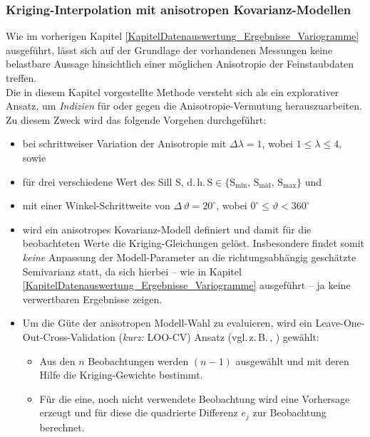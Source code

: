 \subsubsection{Kriging-Interpolation mit anisotropen Kovarianz-Modellen}
\label{KapitelDatenauswertung_Ergebnisse_Kriging}
Wie im vorherigen Kapitel \ref{KapitelDatenauswertung_Ergebnisse_Variogramme} 
ausgeführt, lässt sich auf der Grundlage der vorhandenen Messungen
keine belastbare Aussage hinsichtlich einer möglichen Anisotropie der 
Feinstaubdaten treffen. \\
Die in diesem Kapitel vorgestellte Methode versteht sich als ein explorativer
Ansatz, um \textit{Indizien} für oder gegen die Anisotropie-Vermutung herauszuarbeiten.
Zu diesem Zweck wird das folgende Vorgehen durchgeführt: 
\begin{itemize}[topsep=2pt,parsep=1pt,itemsep=0.5pt]
\item[1) ] bei schrittweiser Variation der Anisotropie mit $\Delta \lambda = 1$, wobei $1 \leq \lambda \leq 4$, sowie
\item[2) ] für drei verschiedene Wert des Sill $\mathrm{S}$, 
d.\,h.\,$\mathrm{S} \in \lbrace \mathrm{S}_{\mathrm{min}},\,\mathrm{S}_{\mathrm{mid}},\,\mathrm{S}_{\mathrm{max}}\rbrace$ und
\item[3) ] mit einer Winkel-Schrittweite von 
$\Delta\,\vartheta= 20^\circ$, wobei 
$0^\circ \leq \vartheta < 360^\circ$
\item[4) ] wird ein anisotropes Kovarianz-Modell definiert 
und damit für die beobachteten Werte die 
Kriging-Gleichungen gelöst. 
Insbesondere findet somit \textit{keine} Anpassung der
Modell-Parameter an 
die richtungsabhängig geschätzte Semivarianz statt, da sich
hierbei -- wie in Kapitel
\ref{KapitelDatenauswertung_Ergebnisse_Variogramme} ausgeführt -- ja keine verwertbaren Ergebnisse zeigen.
\item[5) ] Um die Güte der anisotropen Modell-Wahl zu 
evaluieren, wird
ein Leave-One-Out-Cross-Validation (\textit{kurz:} LOO-CV) 
Ansatz  
(vgl.\,z.\,B.\,\cite[Kap.\,3.8.4]{Murphy2023}, 
\cite[Kap.\,5.1.2]{James2023}) gewählt: 
\begin{itemize}[topsep=2pt,parsep=1pt,itemsep=0.5pt]
\item[a) ] Aus den $n$ Beobachtungen werden 
$(n-1)$ ausgewählt und mit deren Hilfe die 
Kriging-Gewichte bestimmt.
\item[b) ] Für die eine, noch nicht verwendete 
Beobachtung wird eine Vorhersage erzeugt und für diese die
quadrierte Differenz $e_j$ zur Beobachtung berechnet.

\end{itemize}
\end{itemize}
